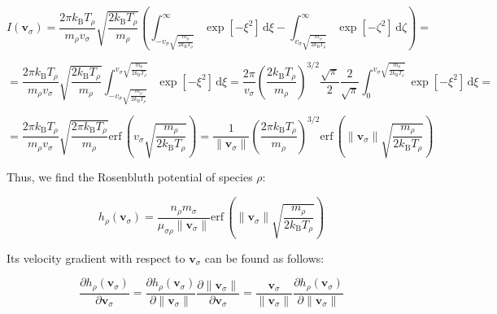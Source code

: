 \begin{equation}
    I(\mathbf{v}_\sigma)=\frac{2\pi k_\mathrm{B}T_\rho}{m_\rho v_\sigma}\sqrt{\frac{2k_\mathrm{B}T_\rho}{m_\rho}}\left(\int_{-v_\sigma\sqrt{\frac{m_\rho}{2k_\mathrm{B}T_\rho}}}^\infty\exp{\left[-\xi^2\right]}\,\mathrm{d}\xi-\int_{v_\sigma\sqrt{\frac{m_\rho}{2k_\mathrm{B}T_\rho}}}^\infty\exp{\left[-\zeta^2\right]}\,\mathrm{d}\zeta\right)=
\end{equation}

\begin{equation}
    =\frac{2\pi k_\mathrm{B}T_\rho}{m_\rho v_\sigma}\sqrt{\frac{2k_\mathrm{B}T_\rho}{m_\rho}}\int_{-v_\sigma\sqrt{\frac{m_\rho}{2k_\mathrm{B}T_\rho}}}^{v_\sigma\sqrt{\frac{m_\rho}{2k_\mathrm{B}T_\rho}}}\exp{\left[-\xi^2\right]}\,\mathrm{d}\xi=\frac{2\pi}{v_\sigma}\left(\frac{2k_\mathrm{B}T_\rho}{m_\rho}\right)^{3/2}\frac{\sqrt{\pi}}{2}\frac{2}{\sqrt{\pi}}\int_0^{v_\sigma\sqrt{\frac{m_\rho}{2k_\mathrm{B}T_\rho}}}\exp{\left[-\xi^2\right]}\,\mathrm{d}\xi=
\end{equation}

\begin{equation}
    =\frac{2\pi k_\mathrm{B}T_\rho}{m_\rho v_\sigma}\sqrt{\frac{2\pi k_\mathrm{B}T_\rho}{m_\rho}}\text{erf}\,\left(v_\sigma\sqrt{\frac{m_\rho}{2k_\mathrm{B}T_\rho}}\right)=\frac{1}{\|\mathbf{v}_\sigma\|}\left(\frac{2\pi k_\mathrm{B}T_\rho}{m_\rho}\right)^{3/2}\text{erf}\,\left(\|\mathbf{v}_\sigma\|\sqrt{\frac{m_\rho}{2k_\mathrm{B}T_\rho}}\right)
\end{equation}

Thus, we find the Rosenbluth potential of species $\rho$:

\begin{equation}
    h_\rho(\mathbf{v}_\sigma)=\frac{n_\rho m_\sigma}{\mu_{\sigma\rho}\|\mathbf{v}_\sigma\|}\text{erf}\,\left(\|\mathbf{v}_\sigma\|\sqrt{\frac{m_\rho}{2k_\mathrm{B}T_\rho}}\right)
\end{equation}

Its velocity gradient with respect to $\mathbf{v}_\sigma$ can be found as follows:

\begin{equation}
    \frac{\partial h_\rho(\mathbf{v}_\sigma)}{\partial\mathbf{v}_\sigma}=\frac{\partial h_\rho(\mathbf{v}_\sigma)}{\partial\|\mathbf{v}_\sigma\|}\frac{\partial\|\mathbf{v}_\sigma\|}{\partial\mathbf{v}_\sigma}=\frac{\mathbf{v}_\sigma}{\|\mathbf{v}_\sigma\|}\frac{\partial h_\rho(\mathbf{v}_\sigma)}{\partial\|\mathbf{v}_\sigma\|}
\end{equation}

